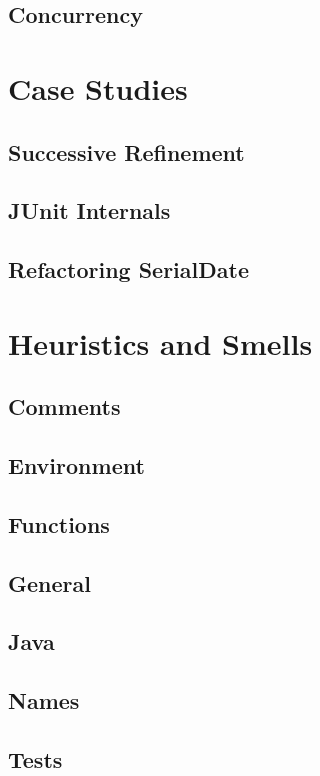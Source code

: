 \documentclass[a4paper, twocolumn]{article}
\begin{document}
\subsection{Concurrency}

\section{Case Studies}

\subsection{Successive Refinement}

\subsection{JUnit Internals}

\subsection{Refactoring SerialDate}


\section{Heuristics and Smells}

\subsection{Comments}

\subsection{Environment}

\subsection{Functions}

\subsection{General}

\subsection{Java}

\subsection{Names}

\subsection{Tests}
\end{document}
